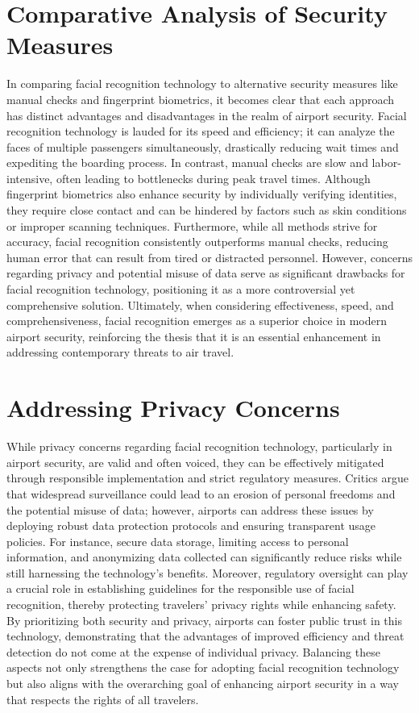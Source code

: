 \documentclass{article}%
\begin{document}
%
\section*{Comparative Analysis of Security Measures}%
\label{sec:ComparativeAnalysisofSecurityMeasures}%
In comparing facial recognition technology to alternative security measures like manual checks and fingerprint biometrics, it becomes clear that each approach has distinct advantages and disadvantages in the realm of airport security. Facial recognition technology is lauded for its speed and efficiency; it can analyze the faces of multiple passengers simultaneously, drastically reducing wait times and expediting the boarding process. In contrast, manual checks are slow and labor{-}intensive, often leading to bottlenecks during peak travel times. Although fingerprint biometrics also enhance security by individually verifying identities, they require close contact and can be hindered by factors such as skin conditions or improper scanning techniques. Furthermore, while all methods strive for accuracy, facial recognition consistently outperforms manual checks, reducing human error that can result from tired or distracted personnel. However, concerns regarding privacy and potential misuse of data serve as significant drawbacks for facial recognition technology, positioning it as a more controversial yet comprehensive solution. Ultimately, when considering effectiveness, speed, and comprehensiveness, facial recognition emerges as a superior choice in modern airport security, reinforcing the thesis that it is an essential enhancement in addressing contemporary threats to air travel.

%
\section*{Addressing Privacy Concerns}%
\label{sec:AddressingPrivacyConcerns}%
While privacy concerns regarding facial recognition technology, particularly in airport security, are valid and often voiced, they can be effectively mitigated through responsible implementation and strict regulatory measures. Critics argue that widespread surveillance could lead to an erosion of personal freedoms and the potential misuse of data; however, airports can address these issues by deploying robust data protection protocols and ensuring transparent usage policies. For instance, secure data storage, limiting access to personal information, and anonymizing data collected can significantly reduce risks while still harnessing the technology's benefits. Moreover, regulatory oversight can play a crucial role in establishing guidelines for the responsible use of facial recognition, thereby protecting travelers’ privacy rights while enhancing safety. By prioritizing both security and privacy, airports can foster public trust in this technology, demonstrating that the advantages of improved efficiency and threat detection do not come at the expense of individual privacy. Balancing these aspects not only strengthens the case for adopting facial recognition technology but also aligns with the overarching goal of enhancing airport security in a way that respects the rights of all travelers.
\end{document}
